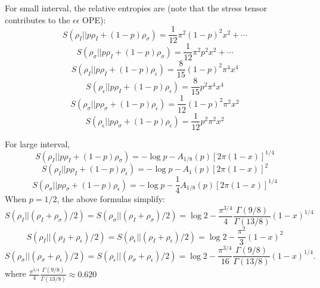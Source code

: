 \documentclass{article}
\theoremstyle{plain}
\theoremstyle{definition}
\theoremstyle{plain}
\begin{document}
For small interval, the relative entropies are (note that the stress tensor contributes to the $\epsilon \epsilon$ OPE):
\begin{equation}
    S(\rho_I|| p\rho_I+(1-p)\rho_\sigma) = \frac{1}{12}\pi^2(1-p)^2 x^2+\cdots
\end{equation}
\begin{equation}
    S(\rho_\sigma|| p\rho_I+(1-p)\rho_\sigma) = \frac{1}{12}\pi^2 p^2 x^2+\cdots
\end{equation}
\begin{equation}
    S(\rho_I|| p\rho_I+(1-p)\rho_\epsilon) =\frac{8}{15}(1-p)^2\pi^4 x^4 
\end{equation}
\begin{equation}
    S(\rho_\epsilon|| p\rho_I+(1-p)\rho_\epsilon) =\frac{8}{15} p^2\pi^4 x^4 
\end{equation}
\begin{equation}
    S(\rho_\sigma|| p\rho_\sigma+(1-p)\rho_\epsilon)  = \frac{1}{12}(1-p)^2\pi^2 x^2 
\end{equation}
\begin{equation}
    S(\rho_\epsilon|| p\rho_\sigma+(1-p)\rho_\epsilon)  = \frac{1}{12}p^2\pi^2 x^2 
\end{equation}

For large interval,
\begin{equation}
    S(\rho_I|| p\rho_I+(1-p)\rho_\sigma) =-\log p -A_{1/8}(p) [2\pi(1-x)]^{1/4} 
\end{equation}
\begin{equation}
   S(\rho_I|| p\rho_I+(1-p)\rho_\epsilon) =-\log p -A_{1}(p)  [2\pi(1-x)]^2
\end{equation}
\begin{equation}
    S(\rho_\sigma|| p\rho_\sigma+(1-p)\rho_\epsilon) =-\log p -\frac{1}{4} A_{1/8}(p) [2\pi(1-x)]^{1/4}
\end{equation}
When $p=1/2$, the above formulas simplify:
\begin{equation}
    S(\rho_I|| (\rho_I+\rho_\sigma)/2)=S(\rho_\sigma|| (\rho_I+\rho_\sigma)/2) =\log 2 -\frac{\pi^{3/4}}{4}\frac{\Gamma(9/8)}{\Gamma(13/8)}(1-x)^{1/4} 
\end{equation}
\begin{equation}
   S(\rho_I|| (\rho_I+\rho_\epsilon)/2)=S(\rho_\epsilon|| (\rho_I+\rho_\epsilon)/2)  =\log 2 -\frac{\pi^2}{3} (1-x)^2
\end{equation}
\begin{equation}
     S(\rho_\sigma|| (\rho_\sigma+\rho_\epsilon)/2)=S(\rho_\epsilon|| (\rho_\sigma+\rho_\epsilon)/2) =\log 2 -\frac{\pi^{3/4}}{16}\frac{\Gamma(9/8)}{\Gamma(13/8)} (1-x)^{1/4}.
\end{equation}
where $\frac{\pi^{3/4}}{4}\frac{\Gamma(9/8)}{\Gamma(13/8)}\approx 0.620$
\end{document}
